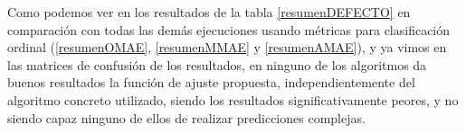 \begin{table}[H]
\centering
{}
\caption{Tabla resumen con los resultados usando la función de ajuste AMAE.}\label{resumenAMAE}
\end{table}


Como podemos ver en los resultados de la tabla \ref{resumenDEFECTO} en comparación con todas las demás ejecuciones usando métricas para clasificación ordinal (\ref{resumenOMAE}, \ref{resumenMMAE} y \ref{resumenAMAE}), y ya vimos en las matrices de confusión de los resultados, en ninguno de los algoritmos da buenos resultados la función de ajuste propuesta, independientemente del algoritmo concreto utilizado, siendo los resultados significativamente peores, y no siendo capaz ninguno de ellos de realizar predicciones complejas.

